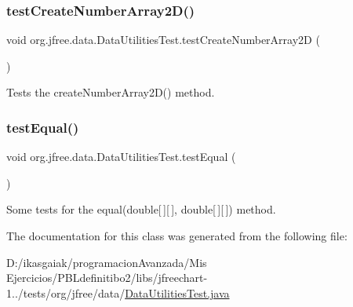 \subsubsection{\texorpdfstring{test\+Create\+Number\+Array2\+D()}{testCreateNumberArray2D()}}
{\footnotesize\ttfamily void org.\+jfree.\+data.\+Data\+Utilities\+Test.\+test\+Create\+Number\+Array2D (\begin{DoxyParamCaption}{ }\end{DoxyParamCaption})}

Tests the create\+Number\+Array2\+D() method. \mbox{\label{classorg_1_1jfree_1_1data_1_1_data_utilities_test_a91b62b500e88d1e049ce3fff07e77e92}} 
\subsubsection{\texorpdfstring{test\+Equal()}{testEqual()}}
{\footnotesize\ttfamily void org.\+jfree.\+data.\+Data\+Utilities\+Test.\+test\+Equal (\begin{DoxyParamCaption}{ }\end{DoxyParamCaption})}

Some tests for the equal(double\mbox{[}$\,$\mbox{]}\mbox{[}$\,$\mbox{]}, double\mbox{[}$\,$\mbox{]}\mbox{[}$\,$\mbox{]}) method. 

The documentation for this class was generated from the following file\+:\begin{DoxyCompactItemize}
\item 
D\+:/ikasgaiak/programacion\+Avanzada/\+Mis Ejercicios/\+P\+B\+Ldefinitibo2/libs/jfreechart-\/1../tests/org/jfree/data/\mbox{\hyperlink{_data_utilities_test_8java}{Data\+Utilities\+Test.\+java}}\end{DoxyCompactItemize}
